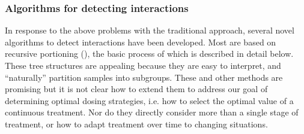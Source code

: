 \documentclass[12pt]{article}
\begin{document}
\subsubsection{Algorithms for detecting interactions} %
\label{ssub:algorithms_for_detecting_interactions}

In response to the above problems with the traditional approach, several novel algorithms to detect interactions have been developed. Most are based on recursive portioning (\cite{Doove2013}), the basic process of which is described in detail below. These tree structures are appealing because they are easy to interpret, and ``naturally'' partition samples into subgroups. These and other methods are promising but it is not clear how to extend them to address our goal of determining optimal dosing strategies, i.e. how to select the optimal value of a continuous treatment. Nor do they directly consider more than a single stage of treatment, or how to adapt treatment over time to changing situations.


%



\end{document}
